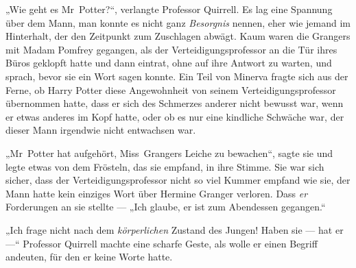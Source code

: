 „Wie geht es Mr~Potter?“, verlangte Professor Quirrell. Es lag eine Spannung über dem Mann, man konnte es nicht ganz \emph{Besorgnis} nennen, eher wie jemand im Hinterhalt, der den Zeitpunkt zum Zuschlagen abwägt. Kaum waren die Grangers mit Madam Pomfrey gegangen, als der Verteidigungsprofessor an die Tür ihres Büros geklopft hatte und dann eintrat, ohne auf ihre Antwort zu warten, und sprach, bevor sie ein Wort sagen konnte. Ein Teil von Minerva fragte sich aus der Ferne, ob Harry Potter diese Angewohnheit von seinem Verteidigungsprofessor übernommen hatte, dass er sich des Schmerzes anderer nicht bewusst war, wenn er etwas anderes im Kopf hatte, oder ob es nur eine kindliche Schwäche war, der dieser Mann irgendwie nicht entwachsen war.

„Mr~Potter hat aufgehört, Miss~Grangers Leiche zu bewachen“, sagte sie und legte etwas von dem Frösteln, das sie empfand, in ihre Stimme. Sie war sich sicher, dass der Verteidigungsprofessor nicht so viel Kummer empfand wie sie, der Mann hatte kein einziges Wort über Hermine Granger verloren. Dass \emph{er} Forderungen an sie stellte —
„Ich glaube, er ist zum Abendessen gegangen.“

„Ich frage nicht nach dem \emph{körperlichen} Zustand des Jungen! Haben sie — hat er —“ Professor Quirrell machte eine scharfe Geste, als wolle er einen Begriff andeuten, für den er keine Worte hatte.

